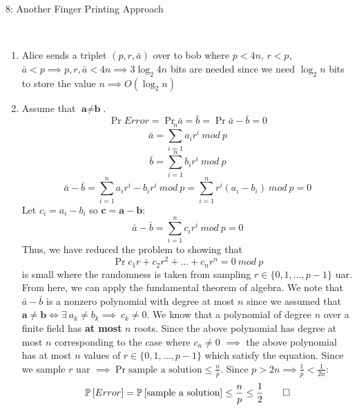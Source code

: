 \documentclass[12pt]{article}
\begin{document}

\begin{problem}{8: Another Finger Printing Approach}
\end{problem}
\begin{solution} \ \\

\begin{enumerate}[label=(\alph*)]
\item Alice sends a triplet $(p, r,\bar{a})$ over to bob where $p < 4n$, $r < p$, $\bar{a} < p \implies p,r,\bar{a} < 4n \implies 3\log_{2}{4n}$ bits are needed since we need $\log_{2}{n}$ bits to store the value $n \implies O(\log_{2}{n})$ 
\item Assume that $\textbf{a}\neq \textbf{b}$. 
\[
\Pr{Error} = \Pr{\bar{a} = \bar{b}} = \Pr{\bar{a}-\bar{b} = 0}
\]
\[
\bar{a} = \sum_{i=1}^{n}{a_{i}r^i}~ mod~p
\]
\[
\bar{b} = \sum_{i=1}^{n}{b_{i}r^i}~ mod~p
\]
\[
\bar{a} - \bar{b} = \sum_{i=1}^{n}{a_{i}r^i - b_{i}r^i}~ mod~p
 = \sum_{i=1}^{n}{r^i(a_{i} - b_{i})}~ mod~p = 0
\]
Let $c_i = a_i - b_i$ so $\textbf{c}  = \textbf{a} - \textbf{b}$:
\[
\bar{a} - \bar{b} = \sum_{i=1}^{n}{c_{i}r^i}~ mod~p = 0
\]
Thus, we have reduced the problem to showing that
\[
\Pr{c_1r + c_2r^2 + ... + c_nr^n = 0 ~ mod~p}
\]
is small where the randomness is taken from sampling $r\in \{0,1,...,p-1\}$ uar.
From here, we can apply the fundamental theorem of algebra. We note that $\bar{a} - \bar{b}$ is a nonzero polynomial with degree at most $n$ since we assumed that $\textbf{a}\neq \textbf{b} \iff \exists~a_k\neq b_k \implies ~c_k\neq0$. We know that a polynomial of degree $n$ over a finite field has \textbf{at most} $n$ roots. Since the above polynomial has degree at most $n$ corresponding to the case where $c_n \neq 0$ $\implies$ the above polynomial has at most $n$ values of $r \in \{0,1,...,p-1\}$ which satisfy the equation. Since we sample $r$ uar $\implies \Pr{\text{sample a solution}} \leq \frac{n}{p}$. Since $p > 2n \implies \frac{1}{p} < \frac{1}{2n}$:
\[
\Pr{Error} =  \Pr{\text{sample a solution}} \leq \frac{n}{p} \leq \frac{1}{2} \qed
\]
\end{enumerate}



\end{solution}
\end{document}
